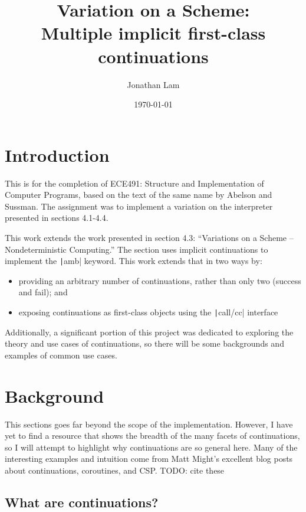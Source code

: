 \documentclass[]{article}
\begin{document}
\title{Variation on a Scheme:\\Multiple implicit first-class continuations}
\author{Jonathan Lam}
\date{\today{}}

\maketitle{}

\section{Introduction}
\label{sec:intr}

This is for the completion of ECE491: Structure and Implementation of Computer Programs, based on the text of the same name by Abelson and Sussman. The assignment was to implement a variation on the interpreter presented in sections 4.1-4.4.

This work extends the work presented in section 4.3: ``Variations on a Scheme -- Nondeterministic Computing.'' The section uses implicit continuations to implement the \texttt|amb| keyword. This work extends that in two ways by:
\begin{itemize}
\item providing an arbitrary number of continuations, rather than only two (success and fail); and
\item exposing continuations as first-class objects using the \texttt|call/cc| interface
\end{itemize}

Additionally, a significant portion of this project was dedicated to exploring the theory and use cases of continuations, so there will be some backgrounds and examples of common use cases.

\section{Background}
\label{sec:back}

This sections goes far beyond the scope of the implementation. However, I have yet to find a resource that shows the breadth of the many facets of continuations, so I will attempt to highlight why continuations are so general here. Many of the interesting examples and intuition come from Matt Might's excellent blog posts about continuations, coroutines, and CSP. TODO: cite these

\subsection{What are continuations?}
\label{sec:what}
\end{document}
